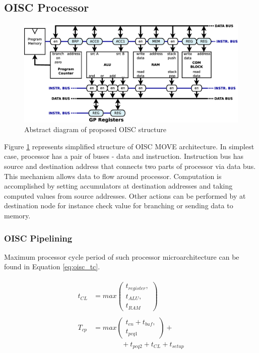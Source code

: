 \subsection{OISC Processor}

\begin{figure}[t!]
	\centering
	\includegraphics[width=\linewidth]{../resources/oisc.eps}
	\caption{Abstract diagram of proposed OISC structure}
	\label{fig:oisc_simple}
\end{figure}

Figure \ref{fig:oisc_simple} represents simplified structure of OISC MOVE architecture. In simplest case, processor has a pair of buses - data and instruction. Instruction bus has source and destination address that connects two parts of processor via data bus. This mechanism allows data to flow around processor. Computation is accomplished by setting accumulators at destination addresses and taking computed values from source addresses. Other actions can be performed by at destination node for instance check value for branching or sending data to memory. 

\subsubsection{OISC Pipelining}
Maximum processor cycle period of such processor microarchitecture can be found in Equation \ref{eq:oisc_tc}. 

\begin{multline}\label{eq:oisc_tc}
	\begin{split}
t_{CL} &= max \left( \begin{matrix}
t_{register},\\
t_{ALU},\\
t_{RAM}\end{matrix}\right)\\
&\\
T_{cp} &= max \left( \begin{matrix}
t_{en} + t_{buf},\\
t_{pcq1}\end{matrix}\right) +\\
&\qquad\qquad+ t_{pcq2} + t_{CL} + t_{setup}
	\end{split}
\end{multline}



